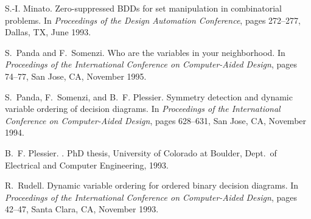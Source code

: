 \documentclass[11pt]{article}
\begin{document}
\begin{thebibliography}{10}
S.-I. Minato.
\newblock Zero-suppressed {BDD}s for set manipulation in combinatorial
  problems.
\newblock In {\em Proceedings of the Design Automation Conference}, pages
  272--277, Dallas, TX, June 1993.

S.~Panda and F.~Somenzi.
\newblock Who are the variables in your neighborhood.
\newblock In {\em Proceedings of the International Conference on Computer-Aided
  Design}, pages 74--77, San Jose, CA, November 1995.

S.~Panda, F.~Somenzi, and B.~F. Plessier.
\newblock Symmetry detection and dynamic variable ordering of decision
  diagrams.
\newblock In {\em Proceedings of the International Conference on Computer-Aided
  Design}, pages 628--631, San Jose, CA, November 1994.

B.~F. Plessier.
.
\newblock PhD thesis, University of Colorado at Boulder, Dept.\ of Electrical
  and Computer Engineering, 1993.

R.~Rudell.
\newblock Dynamic variable ordering for ordered binary decision diagrams.
\newblock In {\em Proceedings of the International Conference on Computer-Aided
  Design}, pages 42--47, Santa Clara, CA, November 1993.

\end{thebibliography}


{}
\printindex
\end{document}
